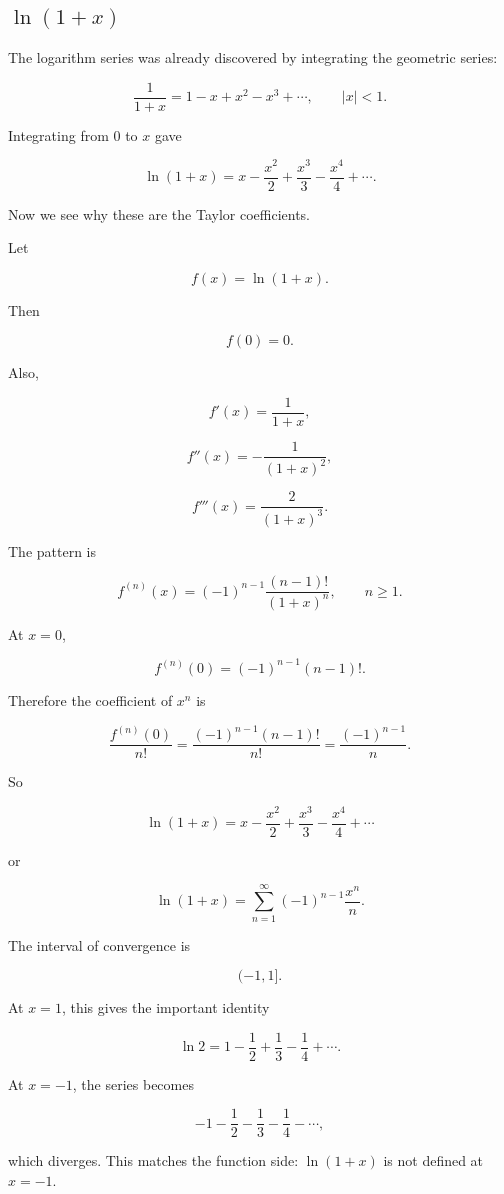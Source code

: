 \subsection{\texorpdfstring{\(\ln(1+x)\)}{ln(1+x)}}
\label{subsec:taylor-series-ln-one-plus-x}

The logarithm series was already discovered by integrating the geometric series:

\[
\frac1{1+x}=1-x+x^2-x^3+\cdots,
\qquad |x|<1.
\]

Integrating from \(0\) to \(x\) gave

\[
\ln(1+x)
=
x-\frac{x^2}{2}+\frac{x^3}{3}-\frac{x^4}{4}+\cdots.
\]

Now we see why these are the Taylor coefficients.

Let

\[
f(x)=\ln(1+x).
\]

Then

\[
f(0)=0.
\]

Also,

\[
f'(x)=\frac1{1+x},
\]

\[
f''(x)=-\frac1{(1+x)^2},
\]

\[
f'''(x)=\frac{2}{(1+x)^3}.
\]

The pattern is

\[
f^{(n)}(x)=
(-1)^{n-1}\frac{(n-1)!}{(1+x)^n},
\qquad n\ge1.
\]

At \(x=0\),

\[
f^{(n)}(0)=(-1)^{n-1}(n-1)!.
\]

Therefore the coefficient of \(x^n\) is

\[
\frac{f^{(n)}(0)}{n!}
=
\frac{(-1)^{n-1}(n-1)!}{n!}
=
\frac{(-1)^{n-1}}{n}.
\]

So

\[
\boxed{
\ln(1+x)
=
x-\frac{x^2}{2}+\frac{x^3}{3}-\frac{x^4}{4}+\cdots
}
\]

or

\[
\boxed{
\ln(1+x)=
\sum_{n=1}^{\infty}
(-1)^{n-1}\frac{x^n}{n}.
}
\]

The interval of convergence is

\[
\boxed{(-1,1].}
\]

At \(x=1\), this gives the important identity

\[
\boxed{
\ln2=1-\frac12+\frac13-\frac14+\cdots.
}
\]

At \(x=-1\), the series becomes

\[
-1-\frac12-\frac13-\frac14-\cdots,
\]

which diverges.  This matches the function side: \(\ln(1+x)\) is not defined at
\(x=-1\).

